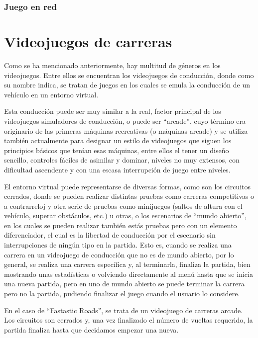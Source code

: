 \subsubsection{Juego en red}

\section{Videojuegos de carreras} 

Como se ha mencionado anteriormente, hay multitud de géneros en los videojuegos. Entre ellos se encuentran los videojuegos de conducción, donde como su nombre indica, se tratan de juegos en los cuales se emula la conducción de un vehículo en un entorno virtual. 

Esta conducción puede ser muy similar a la real, factor principal de los videojuegos simuladores de conducción, o puede ser ``arcade'', cuyo término era originario de las primeras máquinas recreativas (o {máquinas arcade}) y se utiliza también actualmente para designar un estilo de videojuegos que siguen los principios básicos que tenían esas máquinas, entre ellos el tener un diseño sencillo, controles fáciles de asimilar y dominar, niveles no muy extensos, con dificultad ascendente y con una escasa interrupción de juego entre niveles.

El entorno virtual puede representarse de diversas formas, como son los circuitos cerrados, donde se pueden realizar distintas pruebas como carreras competitivas o a contrarreloj y otra serie de pruebas como minijuegos (saltos de altura con el vehículo, superar obstáculos, etc.) u otras, o los escenarios de ``mundo abierto'', en los cuales se pueden realizar también estás pruebas pero con un elemento diferenciador, el cual es la libertad de conducción por el escenario sin interrupciones de ningún tipo en la partida. Esto es, cuando se realiza una carrera en un videojuego de conducción que no es de mundo abierto, por lo general, se realiza una carrera específica y, al terminarla, finaliza la partida, bien mostrando unas estadísticas o volviendo directamente al menú hasta que se inicia una nueva partida, pero en uno de mundo abierto se puede terminar la carrera pero no la partida, pudiendo finalizar el juego cuando el usuario lo considere.

En el caso de ``Fastastic Roads'', se trata de un videojuego de carreras arcade. Los circuitos son cerrados y, una vez finalizado el número de vueltas requerido, la partida finaliza hasta que decidamos empezar una nueva.